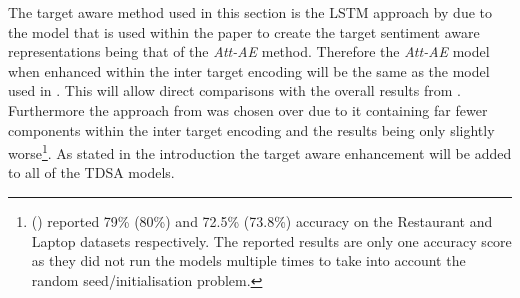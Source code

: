 The target aware method used in this section is the LSTM approach by \citet{hazarika-etal-2018-modeling} due to the model that is used within the paper to create the target sentiment aware representations being that of the \textit{Att-AE} method. Therefore the \textit{Att-AE} model when enhanced within the inter target encoding will be the same as the model used in \citet{hazarika-etal-2018-modeling}. This will allow direct comparisons with the overall results from \citet{hazarika-etal-2018-modeling}. Furthermore the approach from \citet{hazarika-etal-2018-modeling} was chosen over \citet{majumder-etal-2018-iarm} due to it containing far fewer components within the inter target encoding and the results being only slightly worse\footnote{\citet{hazarika-etal-2018-modeling} (\citet{majumder-etal-2018-iarm}) reported 79\% (80\%) and 72.5\% (73.8\%) accuracy on the Restaurant and Laptop datasets respectively. The reported results are only one accuracy score as they did not run the models multiple times to take into account the random seed/initialisation problem.}. As stated in the introduction the target aware enhancement will be added to all of the TDSA models.



